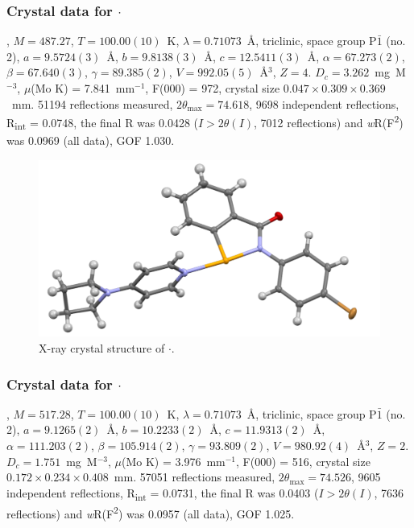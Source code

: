 \begin{refsection}
\subsubsection{Crystal data for \texorpdfstring{$ \cdot $}{C22 H20 Br N2 O Se}}
, $M=487.27$, $T=100.00(10)$~K, $ \lambda=0.71073 $~\AA, triclinic, space group P$\bar{1}$ (no. 2), $a = 9.5724(3)$~\AA, $b = 9.8138(3)$~\AA, $c = 12.5411(3)$~\AA, $\alpha = 67.273(2)$\degree, $\beta = 67.640(3)$\degree, $\gamma = 89.385(2)$\degree, $V = 992.05(5)$~\AA$^{3}$, $Z = 4$. $D_{c}= 3.262$~mg~M$^{-3}$, $\mu$(Mo K\a) = 7.841~mm$^{-1}$, F(000) = 972, crystal size $0.047 \times 0.309 \times 0.369$~mm. 51194 reflections measured, $2\theta_{\max}=74.618$\degree, 9698 independent reflections, R\textsubscript{int} = 0.0748, the final R was 0.0428 ($I > 2\theta(I)$, 7012 reflections) and \textit{w}R(F\textsuperscript{2}) was 0.0969 (all data), GOF 1.030.

\begin{figure}
  \includegraphics[width=0.6\linewidth]{Figures/ebs-4br-pyrrol-xtal.pdf}
  \caption{X-ray crystal structure of \texorpdfstring{$ \cdot $}{C22 H20 Br N2 O Se}.}
\end{figure}

\subsubsection{Crystal data for \texorpdfstring{$ \cdot $}{C22 H20 Br N3 O2 Se}}
, $M=517.28$, $T=100.00(10)$~K, $ \lambda=0.71073 $~\AA, triclinic, space group P$\bar{1}$ (no. 2), $a = 9.1265(2)$~\AA, $b = 10.2233(2)$~\AA, $c = 11.9313(2)$~\AA, $\alpha = 111.203(2)$\degree, $\beta = 105.914(2)$\degree, $\gamma = 93.809(2)$\degree, $V = 980.92(4)$~\AA$^{3}$, $Z = 2$. $D_{c}= 1.751$~mg~M$^{-3}$, $\mu$(Mo K\a) = 3.976~mm$^{-1}$, F(000) = 516, crystal size $0.172 \times 0.234 \times 0.408$~mm. 57051 reflections measured, $2\theta_{\max}=74.526$\degree, 9605 independent reflections, R\textsubscript{int} = 0.0731, the final R was 0.0403 ($I > 2\theta(I)$, 7636 reflections) and \textit{w}R(F\textsuperscript{2}) was 0.0957 (all data), GOF 1.025.


\end{refsection}
